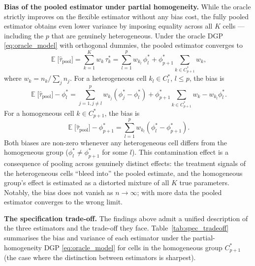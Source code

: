 \documentclass[12pt]{article}
\DeclareMathOperator{\E}{\mathbb{E}}
\newcommand{\1}{\mathbbm{1}}
\begin{document}
\bigskip

\noindent\textbf{Bias of the pooled estimator under partial homogeneity.}
While the oracle strictly improves on the flexible estimator without
any bias cost, the fully pooled estimator obtains even lower variance by
imposing equality across all $K$ cells --- including the $p$ that are
genuinely heterogeneous.
Under the oracle DGP \eqref{eq:oracle_model} with orthogonal dummies, the
pooled estimator converges to
\begin{equation}
  \E\bigl[\hat\tau_{\text{pool}}\bigr]
  = \sum_{k=1}^K w_k\,\tau_k^*
  = \sum_{l=1}^p w_{k_l}\,\phi_l^*
    + \phi_{p+1}^*\!\!\!\sum_{k\in C_{p+1}^*} w_k,
  \label{eq:pool_plim}
\end{equation}
where $w_k = n_k/\sum_j n_j$.
For a heterogeneous cell $k_l \in C_l^*$, $l \leq p$, the bias is
\begin{equation}
  \E\bigl[\hat\tau_{\text{pool}}\bigr] - \phi_l^*
  = \sum_{j=1,j\neq l}^p w_{k_j}(\phi_j^* - \phi_l^*)
    + \phi_{p+1}^*\!\!\!\sum_{k\in C_{p+1}^*} w_k - w_{k_l}\phi_l^*.
  \label{eq:pool_bias_hetero}
\end{equation}
For a homogeneous cell $k \in C_{p+1}^*$, the bias is
\begin{equation}
  \E\bigl[\hat\tau_{\text{pool}}\bigr] - \phi_{p+1}^*
  = \sum_{l=1}^p w_{k_l}(\phi_l^* - \phi_{p+1}^*).
  \label{eq:pool_bias_homo}
\end{equation}
Both biases are non-zero whenever any heterogeneous cell differs from the
homogeneous group ($\phi_l^* \neq \phi_{p+1}^*$ for some $l$).
This contamination effect is a consequence of pooling across genuinely
distinct effects: the treatment signals of the heterogeneous cells
``bleed into'' the pooled estimate, and the homogeneous group's effect
is estimated as a distorted mixture of all $K$ true parameters.
Notably, the bias does not vanish as $n \to \infty$; with more data the
pooled estimator converges to the wrong limit.

\bigskip

\noindent\textbf{The specification trade-off.}
The findings above admit a unified description of the three estimators and
the trade-off they face.
Table~\ref{tab:spec_tradeoff} summarises the bias and variance of each
estimator under the partial-homogeneity DGP \eqref{eq:oracle_model}
for cells in the homogeneous group $C_{p+1}^*$ (the case where the
distinction between estimators is sharpest).
\end{document}
